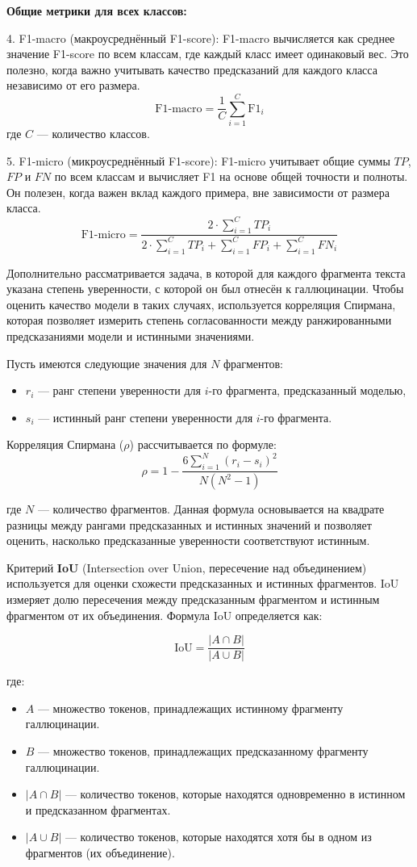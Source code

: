 \documentclass[12pt]{article}
\begin{document}
\textbf{Общие метрики для всех классов:}

4. F1-macro (макроусреднённый F1-score): F1-macro вычисляется как среднее значение F1-score по всем классам, где каждый класс имеет одинаковый вес. Это полезно, когда важно учитывать качество предсказаний для каждого класса независимо от его размера.
\[
\text{F1-macro} = \frac{1}{C} \sum_{i=1}^{C} \text{F1}_i
\]
где \( C \) — количество классов.

5. F1-micro (микроусреднённый F1-score): F1-micro учитывает общие суммы \( TP \), \( FP \) и \( FN \) по всем классам и вычисляет F1 на основе общей точности и полноты. Он полезен, когда важен вклад каждого примера, вне зависимости от размера класса.
\[
\text{F1-micro} = \frac{2 \cdot \sum_{i=1}^{C} TP_i}{2 \cdot \sum_{i=1}^{C} TP_i + \sum_{i=1}^{C} FP_i + \sum_{i=1}^{C} FN_i}
\]

Дополнительно рассматривается задача, в которой для каждого фрагмента текста указана степень уверенности, с которой он был отнесён к галлюцинации. Чтобы оценить качество модели в таких случаях, используется корреляция Спирмана, которая позволяет измерить степень согласованности между ранжированными предсказаниями модели и истинными значениями.

Пусть имеются следующие значения для $N$ фрагментов:
\begin{itemize}
    \item $r_i$ — ранг степени уверенности для $i$-го фрагмента, предсказанный моделью,
    \item $s_i$ — истинный ранг степени уверенности для $i$-го фрагмента.
\end{itemize}

Корреляция Спирмана (\( \rho \)) рассчитывается по формуле:
\[
\rho = 1 - \frac{6 \sum_{i=1}^{N} (r_i - s_i)^2}{N (N^2 - 1)}
\]

где $N$ — количество фрагментов. Данная формула основывается на квадрате разницы между рангами предсказанных и истинных значений и позволяет оценить, насколько предсказанные уверенности соответствуют истинным.

Критерий \textbf{IoU} (Intersection over Union, пересечение над объединением) используется для оценки схожести предсказанных и истинных фрагментов. IoU измеряет долю пересечения между предсказанным фрагментом и истинным фрагментом от их объединения. Формула IoU определяется как:

\[
\text{IoU} = \frac{|A \cap B|}{|A \cup B|}
\]

где:
\begin{itemize}
    \item \( A \) — множество токенов, принадлежащих истинному фрагменту галлюцинации.
    \item \( B \) — множество токенов, принадлежащих предсказанному фрагменту галлюцинации.
    \item \( |A \cap B| \) — количество токенов, которые находятся одновременно в истинном и предсказанном фрагментах.
    \item \( |A \cup B| \) — количество токенов, которые находятся хотя бы в одном из фрагментов (их объединение).
\end{itemize}
\end{document}
